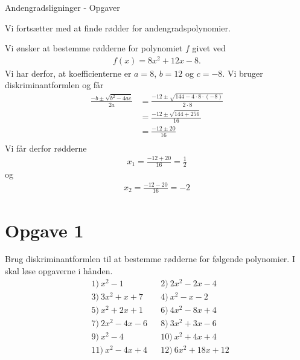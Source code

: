 \begin{center}
\Huge
Andengradsligninger - Opgaver
\end{center}

Vi fortsætter med at finde rødder for andengradspolynomier.

\begin{exa}
Vi ønsker at bestemme rødderne for polynomiet $f$ givet ved
\begin{align*}
f(x) = 8x^2+12x-8.
\end{align*}
Vi har derfor, at koefficienterne er $a = 8$, $b = 12$ og $c= -8$. Vi bruger diskriminantformlen og får
\begin{align*}
\frac{-b\pm \sqrt{b^2-4ac}}{2a} &= \frac{-12 \pm \sqrt{144-4\cdot 8 \cdot (-8)}}{2\cdot 8}\\
&= \frac{-12 \pm \sqrt{144+256}}{16}\\
&= \frac{-12\pm 20}{16}\\
\end{align*}
Vi får derfor rødderne 
\begin{align*}
x_1 =\frac{-12+20}{16} = \frac{1}{2} 
\end{align*}
og 
\begin{align*}
	x_2 = \frac{-12-20}{16} = -2
\end{align*}
\end{exa}



\section*{Opgave 1}
Brug diskriminantformlen til at bestemme rødderne for følgende polynomier. I skal løse opgaverne i hånden. 
\begin{align*}
&1) \ x^2-1   &&2) \ 2x^2-2x-4    \\
&3) \  3x^2+x+7   &&4) \ x^2-x-2   \\
&5) \  x^2+2x+1  &&6) \  4x^2-8x+4  \\
&7) \ 2x^2-4x-6   &&8) \ 3x^2+3x-6   \\
&9) \ x^2-4   &&10) \ x^2+4x+4   \\
&11) \  x^2-4x+4  &&12) \ 6x^2+18x+12   
\end{align*}

